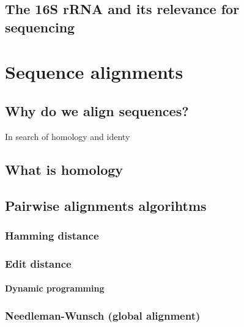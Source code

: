 \documentclass[
  letterpaper,
  DIV=11,
  numbers=noendperiod,
  oneside]{scrreprt}
\begin{document}
\hypertarget{the-16s-rrna-and-its-relevance-for-sequencing}{%
\section{The 16S rRNA and its relevance for
sequencing}\label{the-16s-rrna-and-its-relevance-for-sequencing}}

\hypertarget{sec-aliignments}{%
\chapter{Sequence alignments}\label{sec-aliignments}}

\hypertarget{why-do-we-align-sequences}{%
\section{Why do we align sequences?}\label{why-do-we-align-sequences}}

In search of homology and identy

\hypertarget{what-is-homology}{%
\section{What is homology}\label{what-is-homology}}

\hypertarget{pairwise-alignments-algorihtms}{%
\section{Pairwise alignments
algorihtms}\label{pairwise-alignments-algorihtms}}

\hypertarget{hamming-distance}{%
\subsection{Hamming distance}\label{hamming-distance}}

\hypertarget{edit-distance}{%
\subsection{Edit distance}\label{edit-distance}}

\hypertarget{dynamic-programming}{%
\subsubsection{Dynamic programming}\label{dynamic-programming}}

\hypertarget{needleman-wunsch-global-alignment}{%
\subsection{Needleman-Wunsch (global
alignment)}\label{needleman-wunsch-global-alignment}}
\end{document}

